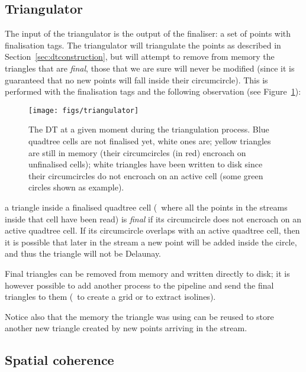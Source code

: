 \subsection{Triangulator}
The input of the triangulator is the output of the finaliser: a set of points with finalisation tags.
The triangulator will triangulate the points as described in Section~\ref{sec:dtconstruction}, but will attempt to remove from memory the triangles that are \emph{final}, those that we are sure will never be modified (since it is guaranteed that no new points will fall inside their circumcircle).
This is performed with the finalisation tags and the following observation (see Figure~\ref{fig:triangulator}): 
\begin{figure}
  \centering
  \texttt{[image: figs/triangulator]}
  \caption{The DT at a given moment during the triangulation process. Blue quadtree cells are not finalised yet, white ones are; yellow triangles are still in memory (their circumcircles (in red) encroach on unfinalised cells); white triangles have been written to disk since their circumcircles do not encroach on an active cell (some green circles shown as example).}%
\label{fig:triangulator}
\end{figure}
a triangle inside a finalised quadtree cell (\ie\ where all the points in the streams inside that cell have been read) is \emph{final}%
if its circumcircle does not encroach on an active quadtree cell.
If its circumcircle overlaps with an active quadtree cell, then it is possible that later in the stream a new point will be added inside the circle, and thus the triangle will not be Delaunay.

%

Final triangles can be removed from memory and written directly to disk; it is however possible to add another process to the pipeline and send the final triangles to them (\eg\ to create a grid or to extract isolines).

%

Notice also that the memory the triangle was using can be reused to store another new triangle created by new points arriving in the stream.


\subsection{Spatial coherence}%
\label{sec:spatial_coherence}

